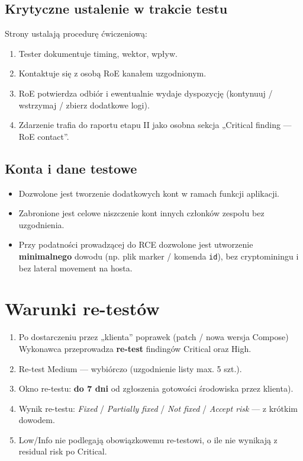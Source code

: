 \documentclass[11pt,a4paper]{article}
\begin{document}
\subsection{Krytyczne ustalenie w trakcie testu}

Strony ustalają procedurę ćwiczeniową:
\begin{enumerate}[leftmargin=*]
  \item Tester dokumentuje timing, wektor, wpływ.
  \item Kontaktuje się z osobą RoE kanałem uzgodnionym.
  \item RoE potwierdza odbiór i ewentualnie wydaje dyspozycję (kontynuuj / wstrzymaj / zbierz dodatkowe logi).
  \item Zdarzenie trafia do raportu etapu II jako osobna sekcja „Critical finding — RoE contact”.
\end{enumerate}

\subsection{Konta i dane testowe}
\begin{itemize}[leftmargin=*]
  \item Dozwolone jest tworzenie dodatkowych kont w ramach funkcji aplikacji.
  \item Zabronione jest celowe niszczenie kont innych członków zespołu bez uzgodnienia.
  \item Przy podatności prowadzącej do RCE dozwolone jest utworzenie \textbf{minimalnego} dowodu (np. plik marker / komenda \texttt{id}), bez cryptominingu i bez lateral movement na hosta.
\end{itemize}

\section{Warunki re-testów}
\begin{enumerate}[leftmargin=*]
  \item Po dostarczeniu przez „klienta” poprawek (patch / nowa wersja Compose) Wykonawca przeprowadza \textbf{re-test} findingów Critical oraz High.
  \item Re-test Medium — wybiórczo (uzgodnienie listy max. 5 szt.).
  \item Okno re-testu: \textbf{do 7 dni} od zgłoszenia gotowości środowiska przez klienta).
  \item Wynik re-testu: \emph{Fixed} / \emph{Partially fixed} / \emph{Not fixed} / \emph{Accept risk} — z krótkim dowodem.
  \item Low/Info nie podlegają obowiązkowemu re-testowi, o ile nie wynikają z residual risk po Critical.
\end{enumerate}
\end{document}
